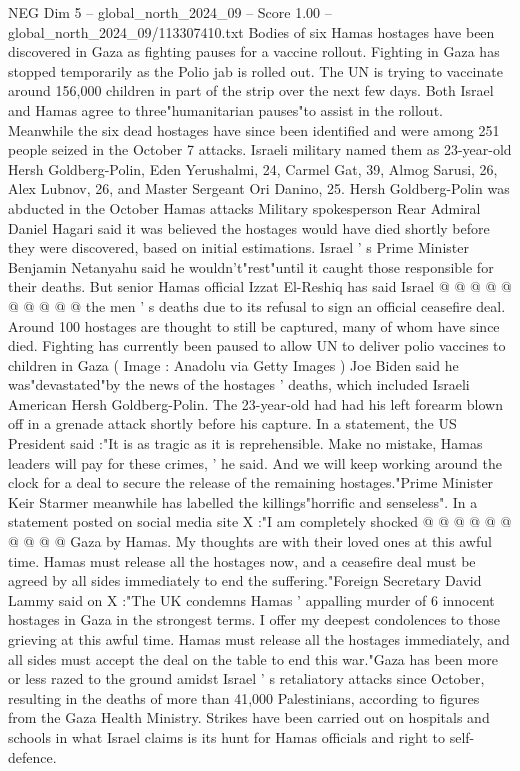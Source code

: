 \begin{textsample}{NEG Dim 5 – global\_north\_2024\_09 – Score 1.00 – global\_north\_2024\_09/113307410.txt}  \label{ex:f5_neg_147}
Bodies of six Hamas hostages have been discovered in Gaza as fighting pauses for a vaccine rollout.
Fighting in Gaza has stopped temporarily as the Polio jab is rolled out.
The UN is trying to vaccinate around 156,000 children in part of the strip over the next few days.
Both Israel and Hamas agree to three"humanitarian pauses"to assist in the rollout.
Meanwhile the six dead hostages have since been identified and were among 251 people seized in the October 7 attacks.
Israeli military named them as 23-year-old Hersh Goldberg-Polin, Eden Yerushalmi, 24, Carmel Gat, 39, Almog Sarusi, 26, Alex Lubnov, 26, and Master Sergeant Ori Danino, 25.
Hersh Goldberg-Polin was abducted in the October Hamas attacks Military spokesperson Rear Admiral Daniel Hagari said it was believed the hostages would have died shortly before they were discovered, based on initial estimations.
Israel ' s Prime Minister Benjamin Netanyahu said he wouldn't"rest"until it caught those responsible for their deaths.
But senior Hamas official Izzat El-Reshiq has said Israel @ @ @ @ @ @ @ @ @ @ the men ' s deaths due to its refusal to sign an official ceasefire deal.
Around 100 hostages are thought to still be captured, many of whom have since died.
Fighting has currently been paused to allow UN to deliver polio vaccines to children in Gaza ( Image : Anadolu via Getty Images ) Joe Biden said he was"devastated"by the news of the hostages ' deaths, which included Israeli American Hersh Goldberg-Polin.
The 23-year-old had had his left forearm blown off in a grenade attack shortly before his capture.
In a statement, the US President said :"It is as tragic as it is reprehensible.
Make no mistake, Hamas leaders will pay for these crimes, ' he said.
And we will keep working around the clock for a deal to secure the release of the remaining hostages."Prime Minister Keir Starmer meanwhile has labelled the killings"horrific and senseless".
In a statement posted on social media site X :"I am completely shocked @ @ @ @ @ @ @ @ @ @ Gaza by Hamas.
My thoughts are with their loved ones at this awful time.
Hamas must release all the hostages now, and a ceasefire deal must be agreed by all sides immediately to end the suffering."Foreign Secretary David Lammy said on X :"The UK condemns Hamas ' appalling murder of 6 innocent hostages in Gaza in the strongest terms.
I offer my deepest condolences to those grieving at this awful time.
Hamas must release all the hostages immediately, and all sides must accept the deal on the table to end this war."Gaza has been more or less razed to the ground amidst Israel ' s retaliatory attacks since October, resulting in the deaths of more than 41,000 Palestinians, according to figures from the Gaza Health Ministry.
Strikes have been carried out on hospitals and schools in what Israel claims is its hunt for Hamas officials and right to self-defence.

\end{textsample}
